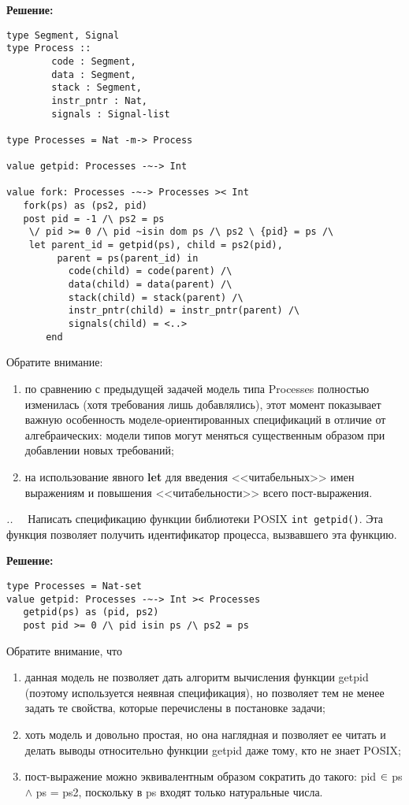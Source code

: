 \documentclass[14pt, twoside]{extreport}
\newcounter{problem_type}[chapter]
\newcounter{zadacha}[problem_type]
\newcommand{\z}{\vspace{0.5cm}\par\addtocounter{zadacha}{1}%
\textit{\arabic{chapter}.\arabic{problem_type}.\arabic{zadacha}}~~  }
\begin{document}
\textbf{Решение:}
\begin{lstlisting}
type Segment, Signal
type Process ::
		code : Segment,
		data : Segment,
		stack : Segment,
		instr_pntr : Nat,
		signals : Signal-list

type Processes = Nat -m-> Process

value getpid: Processes -~-> Int

value fork: Processes -~-> Processes >< Int
   fork(ps) as (ps2, pid)
   post pid = -1 /\ ps2 = ps
   	\/ pid >= 0 /\ pid ~isin dom ps /\ ps2 \ {pid} = ps /\
	let parent_id = getpid(ps), child = ps2(pid),
	     parent = ps(parent_id) in
   	       code(child) = code(parent) /\
   	       data(child) = data(parent) /\
   	       stack(child) = stack(parent) /\
   	       instr_pntr(child) = instr_pntr(parent) /\
   	       signals(child) = <..>
   	   end
\end{lstlisting}

Обратите внимание:
\begin{enumerate}
  \item по сравнению с предыдущей задачей модель типа Processes полностью изменилась (хотя требования лишь добавлялись), этот момент показывает важную особенность моделе-ориентированных спецификаций в отличие от алгебраических: модели типов могут меняться существенным образом при добавлении новых требований;
  \item на использование явного \textbf{let} для введения <<читабельных>> имен выражениям и повышения <<читабельности>> всего пост-выражения.
\end{enumerate}

\z Написать спецификацию функции библиотеки POSIX \texttt{int getpid()}. Эта функция позволяет получить идентификатор процесса, вызвавшего эта функцию.

\textbf{Решение:}
\begin{lstlisting}
type Processes = Nat-set
value getpid: Processes -~-> Int >< Processes
   getpid(ps) as (pid, ps2)
   post pid >= 0 /\ pid isin ps /\ ps2 = ps
\end{lstlisting}

Обратите внимание, что
\begin{enumerate}
  \item данная модель не позволяет дать алгоритм вычисления функции getpid (поэтому используется неявная спецификация), но позволяет тем не менее задать те свойства, которые перечислены в постановке задачи;
  \item хоть модель и довольно простая, но она наглядная и позволяет ее читать и делать выводы относительно функции getpid даже тому, кто не знает POSIX;
  \item пост-выражение можно эквивалентным образом сократить до такого: pid $\in$ ps $\wedge$ ps = ps2, поскольку в ps входят только натуральные числа.
\end{enumerate}
\end{document}
